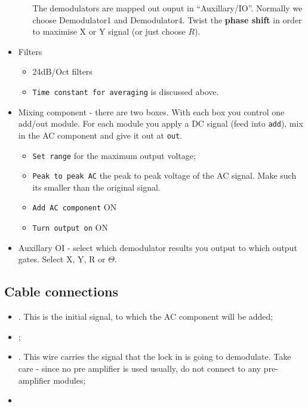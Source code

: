 \begin{itemize}
\begin{itemize}
      The   demodulators    are   mapped    out   ouput       in
      ``Auxillary/IO''.   Normally  we  choose  Demodulator1  and  Demodulator4.
      Twist the \textbf{phase shift} in order to maximise X or Y signal (or just
      choose $R$).
    \end{itemize}
  \item Filters
    \begin{itemize}
    \item 24dB/Oct filters
    \item \texttt{Time constant for averaging} is discussed above.
    \end{itemize}
  \item Mixing component  - there are two  boxes. With each box  you control one
    add/out  module.  For  each  module  you   apply  a  DC  signal  (feed  into
    \texttt{add}), mix in the AC component and give it out at \texttt{out}.
    \begin{itemize}
    \item \texttt{Set range} for the maximum output voltage;
    \item \texttt{Peak  to peak  AC} \ira  the peak  to peak  voltage of  the AC
      signal. Make such its smaller than the original signal.
    \item \texttt{Add AC component} \ira ON
    \item \texttt{Turn output on} \ira ON
    \end{itemize}
  \item Auxillary  OI -  select which  demodulator results  you output  to which
    output gates. Select X, Y, R or $\Theta$.
  \end{itemize}

  \subsection{Cable connections}
  \begin{itemize}
  \item {}. This is the initial signal, to which the AC component
    will be added;
  \item {};
  \item {}. This  wire carries the  signal that the lock  in is
    going to demodulate. Take care - since  no pre amplifier is used usually, do
    not connect to any pre-amplifier modules;
  \item {}
  \end{itemize}


